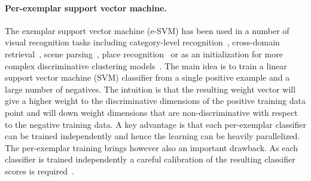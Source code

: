 
\paragraph{Per-exemplar support vector machine.} 
    The exemplar support vector machine (e-SVM) has been used in a number of visual recognition tasks including
    category-level recognition~\cite{Malisiewicz11}, cross-domain retrieval~\cite{Shrivastava11}, scene parsing~\cite{Tighe13}, %
    place recognition~\cite{Gronat13} or as an initialization  for more complex discriminative clustering models~\cite{Doersch12,Singh12}. The main idea is to train a linear support vector machine (SVM) classifier from a single positive example and a large number of negatives. The intuition is that the resulting weight vector will give a higher weight to the discriminative dimensions of the positive training data point and will down weight dimensions that are non-discriminative with respect to the negative training data. A key advantage is that each per-exemplar classifier can be trained independently and hence the learning can be heavily parallelized. 
    The per-exemplar training brings however also an important drawback. As each classifier is trained independently a
    careful calibration of the resulting classifier scores is required~\cite{Malisiewicz11}. 


